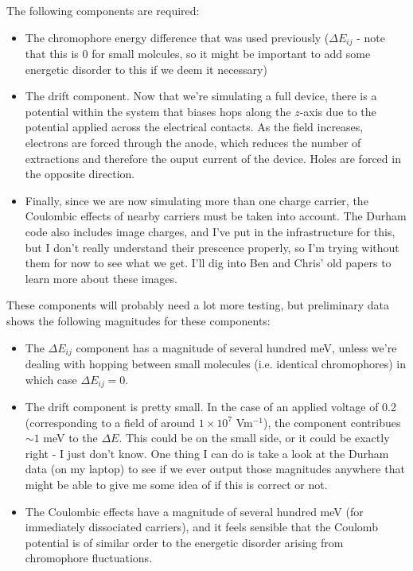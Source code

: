 \documentclass[12pt]{article}
\begin{document}
The following components are required:

\begin{itemize}
\item{The chromophore energy difference that was used previously ($\Delta E_{ij}$ - note that this is 0 for small molcules, so it might be important to add some energetic disorder to this if we deem it necessary)}
\item{The drift component.
        Now that we're simulating a full device, there is a potential within the system that biases hops along the $z$-axis due to the potential applied across the electrical contacts.
        As the field increases, electrons are forced through the anode, which reduces the number of extractions and therefore the ouput current of the device.
    Holes are forced in the opposite direction.}
\item{Finally, since we are now simulating more than one charge carrier, the Coulombic effects of nearby carriers must be taken into account.
    The Durham code also includes image charges, and I've put in the infrastructure for this, but I don't really understand their prescence properly, so I'm trying without them for now to see what we get.
    I'll dig into Ben and Chris' old papers to learn more about these images.}
\end{itemize}

These components will probably need a lot more testing, but preliminary data shows the following magnitudes for these components:

\begin{itemize}
    \item{The $\Delta E_{ij}$ component has a magnitude of several hundred meV, unless we're dealing with hopping between small molecules (i.e. identical chromophores) in which case $\Delta E_{ij} = 0$.}
    \item{The drift component is pretty small. In the case of an applied voltage of 0.2 (corresponding to a field of around $1 \times 10^{7}$ Vm$^{-1}$), the component contribues $\sim 1$ meV to the $\Delta E$.
        This could be on the small side, or it could be exactly right - I just don't know.
        One thing I can do is take a look at the Durham data (on my laptop) to see if we ever output those magnitudes anywhere that might be able to give me some idea of if this is correct or not.}
    \item{The Coulombic effects have a magnitude of several hundred meV (for immediately dissociated carriers), and it feels sensible that the Coulomb potential is of similar order to the energetic disorder arising from chromophore fluctuations.}
\end{itemize}
\clearpage
\end{document}
